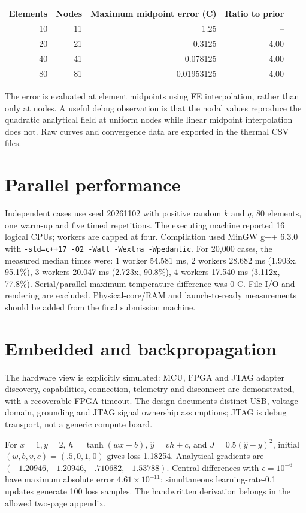 \documentclass[10pt]{article}
\begin{document}
\begin{center}\begin{tabular}{rrrr}\toprule Elements&Nodes&Maximum midpoint error (C)&Ratio to prior\\\midrule 10&11&1.25&--\\20&21&0.3125&4.00\\40&41&0.078125&4.00\\80&81&0.01953125&4.00\\\bottomrule\end{tabular}\end{center}
The error is evaluated at element midpoints using FE interpolation, rather than only at nodes. A useful debug observation is that the nodal values reproduce the quadratic analytical field at uniform nodes while linear midpoint interpolation does not. Raw curves and convergence data are exported in the thermal CSV files.

\section*{Parallel performance}
Independent cases use seed 20261102 with positive random $k$ and $q$, 80 elements, one warm-up and five timed repetitions. The executing machine reported 16 logical CPUs; workers are capped at four. Compilation used MinGW g++ 6.3.0 with \texttt{-std=c++17 -O2 -Wall -Wextra -Wpedantic}. For 20,000 cases, the measured median times were: 1 worker 54.581 ms, 2 workers 28.682 ms (1.903x, 95.1\%), 3 workers 20.047 ms (2.723x, 90.8\%), 4 workers 17.540 ms (3.112x, 77.8\%). Serial/parallel maximum temperature difference was 0 C. File I/O and rendering are excluded. Physical-core/RAM and launch-to-ready measurements should be added from the final submission machine.

\section*{Embedded and backpropagation}
The hardware view is explicitly simulated: MCU, FPGA and JTAG adapter discovery, capabilities, connection, telemetry and disconnect are demonstrated, with a recoverable FPGA timeout. The design documents distinct USB, voltage-domain, grounding and JTAG signal ownership assumptions; JTAG is debug transport, not a generic compute board.

For $x=1,y=2$, $h=\tanh(wx+b)$, $\hat y=vh+c$, and $J=0.5(\hat y-y)^2$, initial $(w,b,v,c)=(.5,0,1,0)$ gives loss 1.18254. Analytical gradients are $(-1.20946,-1.20946,-.710682,-1.53788)$. Central differences with $\epsilon=10^{-6}$ have maximum absolute error $4.61\times10^{-11}$; simultaneous learning-rate-0.1 updates generate 100 loss samples. The handwritten derivation belongs in the allowed two-page appendix.
\end{document}
